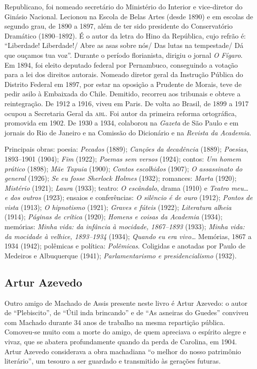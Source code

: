 Republicano, foi nomeado secretário do Ministério do Interior e
vice-diretor do Ginásio Nacional. Lecionou na Escola de Belas Artes
(desde 1890) e em escolas de segundo grau, de 1890 a 1897, além de ter
sido presidente do Conservatório Dramático (1890--1892). É o autor da
letra do Hino da República, cujo refrão é: ``Liberdade! Liberdade!/ Abre
as asas sobre nós/ Das lutas na tempestade/ Dá que ouçamos tua voz''.
Durante o período florianista, dirigiu o jornal \emph{O Fígaro}. Em
1894, foi eleito deputado federal por Pernambuco, conseguindo a votação
para a lei dos direitos autorais. Nomeado diretor geral da Instrução
Pública do Distrito Federal em 1897, por estar na oposição a Prudente de
Morais, teve de pedir asilo à Embaixada do Chile. Demitido, recorreu aos
tribunais e obteve a reintegração. De 1912 a 1916, viveu em Paris. De
volta ao Brasil, de 1899 a 1917 ocupou a Secretaria Geral da \textsc{abl}. Foi
autor da primeira reforma ortográfica, promovida em 1902. De 1930 a
1934, colaborou na \emph{Gazeta} de São Paulo e em jornais do Rio de
Janeiro e na Comissão do Dicionário e na \emph{Revista da Academia}.

Principais obras: poesia: \emph{Pecados} (1889); \emph{Canções
da decadência} (1889); \emph{Poesias}, 1893--1901 (1904); \emph{Fim}
(1922); \emph{Poemas sem versos} (1924); contos: \emph{Um homem prático}
(1898); \emph{Mãe Tapuia} (1900); \emph{Contos escolhidos} (1907);
\emph{O assassinato do general} (1926); \emph{Se eu fosse Sherlock
Holmes} (1932); romances: \emph{Marta} (1920); \emph{Mistério} (1921);
\emph{Laura} (1933); teatro: \emph{O escândalo}, drama (1910) e
\emph{Teatro meu\ldots{} e dos outros} (1923); ensaios e conferências:
\emph{O silêncio é de ouro} (1912); \emph{Pontos de vista} (1913);
\emph{O hipnotismo} (1921); \emph{Graves e fúteis} (1922);
\emph{Literatura alheia} (1914); \emph{Páginas de crítica} (1920);
\emph{Homens e coisas da Academia} (1934); memórias: \emph{Minha vida:
da infância à mocidade, 1867--1893} (1933); \emph{Minha vida: da mocidade
à velhice, 1893--1934} (1934); \emph{Quando eu era vivo\ldots{}}
Memórias, 1867 a 1934 (1942); polêmicas e política: \emph{Polêmicas}.
Coligidas e anotadas por Paulo de Medeiros e Albuquerque (1941);
\emph{Parlamentarismo e presidencialismo} (1932).

\subsection{Artur Azevedo}

Outro amigo de Machado de Assis presente neste livro é Artur Azevedo: o
autor de ``Plebiscito'', de ``Útil inda brincando'' e de ``As asneiras
do Guedes'' conviveu com Machado durante 34 anos de trabalho na mesma
repartição pública. Comoveu-se muito com a morte do amigo, de quem
apreciava o espírito alegre e vivaz, que se abatera profundamente quando
da perda de Carolina, em 1904. Artur Azevedo considerava a obra
machadiana ``o melhor do nosso patrimônio literário'', um tesouro a ser
guardado e transmitido às gerações futuras.

